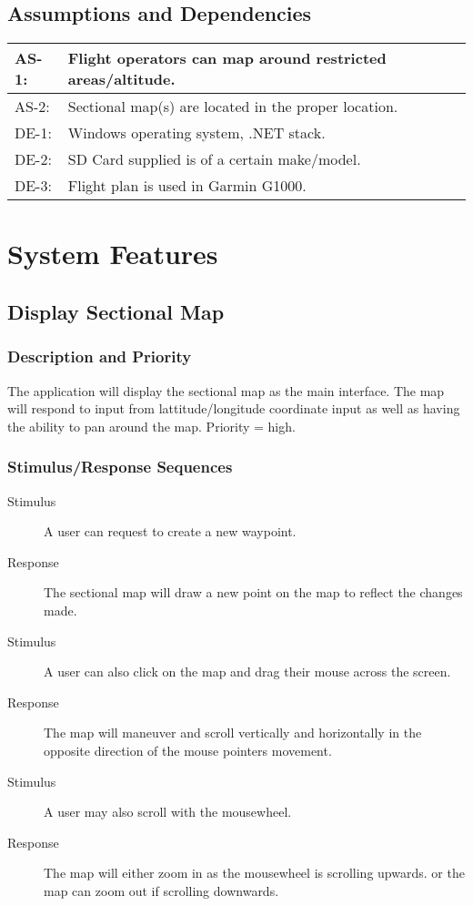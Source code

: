 \documentclass[12pt, letterpaper]{article}
\begin{document}
\subsection{Assumptions and Dependencies}
\begin{tabularx}{\textwidth}{|l|X|} \hline
AS-1: & Flight operators can map around restricted areas/altitude. \\ \hline
AS-2: & Sectional map(s) are located in the proper location. \\ \hline
DE-1: & Windows operating system, .NET stack. \\ \hline
DE-2: & SD Card supplied is of a certain make/model. \\ \hline
DE-3: & Flight plan is used in Garmin G1000. \\ \hline
\end{tabularx}

\pagebreak
\section{System Features}
\subsection{Display Sectional Map}
\subsubsection{Description and Priority}
The application will display the sectional map as the main interface.
The map will respond to input from lattitude/longitude coordinate input as well as having the ability to pan around the map.
Priority = high.

\subsubsection{Stimulus/Response Sequences}
\begin{description}
    \item[Stimulus] A user can request to create a new waypoint.
    \item[Response]	The sectional map will draw a new point on the map to reflect the changes made.
    \item[Stimulus] A user can also click on the map and drag their mouse across the screen.
    \item[Response] The map will maneuver and scroll vertically and horizontally in the opposite direction of the mouse pointers movement.
    \item[Stimulus] A user may also scroll with the mousewheel.
    \item[Response] The map will either zoom in as the mousewheel is scrolling upwards.
        or the map can zoom out if scrolling downwards.
\end{description}
\end{document}
